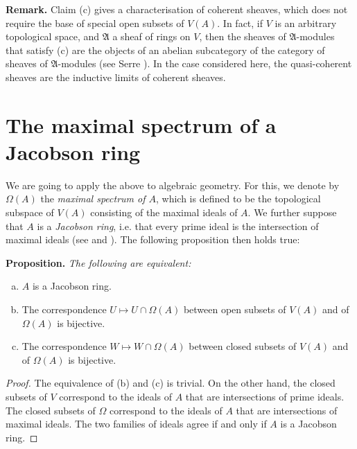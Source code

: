 \documentclass{article}
\newenvironment{itenv}[1]
  {\phantomsection\par\medskip\noindent\textbf{#1.}\itshape}
  {\medskip}
\newenvironment{rmenv}[1]
  {\phantomsection\par\medskip\noindent\textbf{#1.}\rmfamily}
  {\medskip}
\newcommand{\oldpage}[1]{\marginpar{\footnotesize$\Big\vert$ \textit{p.~#1}}}
\begin{document}
\begin{rmenv}{Remark}
\label{remark-theorem3}
\oldpage{1-11}
  Claim (c) gives a characterisation of coherent sheaves, which does not require the base of special open subsets of $V(A)$.
  In fact, if $V$ is an arbitrary topological space, and $\mathfrak{A}$ a sheaf of rings on $V$, then the sheaves of $\mathfrak{A}$-modules that satisfy (c) are the objects of an abelian subcategory of the category of sheaves of $\mathfrak{A}$-modules (see Serre \cite{4}).
  In the case considered here, the quasi-coherent sheaves are the inductive limits of coherent sheaves.
\end{rmenv}


\section{The maximal spectrum of a Jacobson ring}
\label{section5}

We are going to apply the above to algebraic geometry.
For this, we denote by $\Omega(A)$ the \emph{maximal spectrum of $A$}, which is defined to be the topological subspace of $V(A)$ consisting of the maximal ideals of $A$.
We further suppose that $A$ is a \emph{Jacobson ring}, i.e. that every prime ideal is the intersection of maximal ideals (see \cite{1} and \cite{3}).
The following proposition then holds true:

\begin{itenv}{Proposition}
  The following are equivalent:
  \begin{enumerate}[(a)]
    \item $A$ is a Jacobson ring.
    \item The correspondence $U\mapsto U\cap\Omega(A)$ between open subsets of $V(A)$ and of $\Omega(A)$ is bijective.
    \item The correspondence $W\mapsto W\cap\Omega(A)$ between closed subsets of $V(A)$ and of $\Omega(A)$ is bijective.
  \end{enumerate}
\end{itenv}

\begin{proof}
  The equivalence of (b) and (c) is trivial.
  On the other hand, the closed subsets of $V$ correspond to the ideals of $A$ that are intersections of prime ideals.
  The closed subsets of $\Omega$ correspond to the ideals of $A$ that are intersections of maximal ideals.
  The two families of ideals agree if and only if $A$ is a Jacobson ring.
\end{proof}
\end{document}
